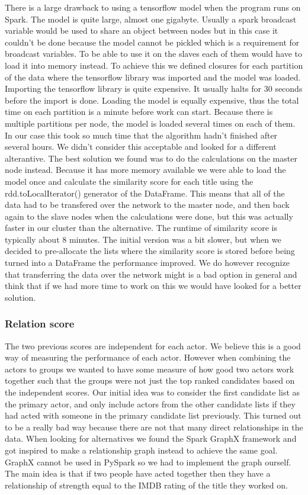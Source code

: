 There is a large drawback to using a tensorflow model when the program runs on Spark. The model is quite large, almost one gigabyte. Usually a spark broadcast variable would be used to share an object between nodes but in this case it couldn't be done because the model cannot be pickled which is a requirement for broadcast variables. To be able to use it on the slaves each of them would have to load it into memory instead. To achieve this we defined closures for each partition of the data where the tensorflow library was imported and the model was loaded. Importing the tensorflow library is quite expensive. It usually halts for 30 seconds before the import is done. Loading the model is equally expensive, thus the total time on each partition is a minute before work can start. Because there is multiple partitions per node, the model is loaded several times on each of them. In our case this took so much time that the algorithm hadn't finished after several hours. We didn't consider this acceptable and looked for a different alterantive. The best solution we found was to do the calculations on the master node instead. Because it has more memory available we were able to load the model once and calculate the similarity score for each title using the rdd.toLocalIterator() generator of the DataFrame. This means that all of the data had to be transfered over the network to the master node, and then back again to the slave nodes when the calculations were done, but this was actually faster in our cluster than the alternative. The runtime of similarity score is typically about 8 minutes. The initial version was a bit slower, but when we decided to pre-allocate the lists where the similarity score is stored before being turned into a DataFrame the performance improved. We do however recognize that transferring the data over the network might is a bad option in general and think that if we had more time to work on this we would have looked for a better solution.

\subsubsection{Relation score}
The two previous scores are independent for each actor. We believe this is a good way of measuring the performance of each actor. However when combining the actors to groups we wanted to have some measure of how good two actors work together such that the groups were not just the top ranked candidates based on the independent scores. Our initial idea was to consider the first candidate list as the primary actor, and only include actors from the other candidate lists if they had acted with someone in the primary candidate list previously. This turned out to be a really bad way because there are not that many direct relationships in the data. When looking for alternatives we found the Spark GraphX framework and got inspired to make a relationship graph instead to achieve the same goal. GraphX cannot be used in PySpark so we had to implement the graph ourself. The main idea is that if two people have acted together then they have a relationship of strength equal to the IMDB rating of the title they worked on.

